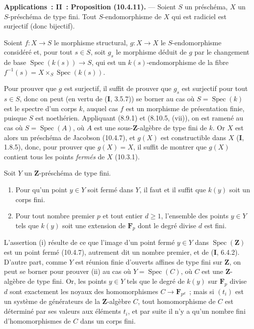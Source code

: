 \begin{env}[10.4.11]
\textbf{Applications~: II~: Proposition (10.4.11).} --- Soient $S$ un
préschéma, $X$ un $S$-préschéma de type fini. Tout $S$-endomorphisme de $X$
qui est radiciel est surjectif (donc bijectif).
\end{env}

Soient $f:X\to S$ le morphisme structural, $g:X\to X$ le $S$-endomorphisme
considéré et, pour tout $s\in S$, soit $g_s$ le morphisme déduit de $g$ par le
changement de base $\operatorname{Spec}(k(s))\to S$, qui est un
$k(s)$-endomorphisme de la fibre
$f^{-1}(s)=X\times_S\operatorname{Spec}(k(s))$.

Pour prouver que $g$ est surjectif, il suffit de prouver que $g_s$ est
surjectif pour tout $s\in S$, donc on peut (en vertu de (\textbf{I}, 3.5.7))
se borner au cas où $S=\operatorname{Spec}(k)$ est le spectre d'un corps $k$,
auquel cas $f$ est un morphisme de présentation finie, puisque $S$ est
noethérien. Appliquant (8.9.1) et (8.10.5, (vii)), on est ramené au cas où
$S=\operatorname{Spec}(A)$, où $A$ est une sous-$\mathbf Z$-algèbre de type
fini de $k$. Or $X$ est alors un préschéma de Jacobson (10.4.7), et $g(X)$ est
constructible dans $X$ (\textbf{I}, 1.8.5), donc, pour prouver que $g(X)=X$,
il suffit de montrer que $g(X)$ contient tous les points \emph{fermés} de $X$
(10.3.1).

\begin{lemma}[10.4.11.1]
\label{IV.10.4.11.1-fr}
Soit $Y$ un $\mathbf Z$-préschéma de type fini.
\begin{enumerate}[label=(\roman*)]
  \item Pour qu'un point $y\in Y$ soit fermé dans $Y$, il faut et il suffit
  que $k(y)$ soit un corps fini.
  \item Pour tout nombre premier $p$ et tout entier $d\geq1$, l'ensemble des
  points $y\in Y$ tels que $k(y)$ soit une extension de $\mathbf F_p$ dont le
  degré divise $d$ est fini.
\end{enumerate}
\end{lemma}

L'assertion (i) résulte de ce que l'image d'un point fermé $y\in Y$ dans
$\operatorname{Spec}(\mathbf Z)$ est un point fermé (10.4.7), autrement dit
un nombre premier, et de (\textbf{I}, 6.4.2). D'autre part, comme $Y$ est
réunion finie d'ouverts affines de type fini sur $\mathbf Z$, on peut se
borner pour prouver (ii) au cas où $Y=\operatorname{Spec}(C)$, où $C$ est une
$\mathbf Z$-algèbre de type fini. Or, les points $y\in Y$ tels que le degré de
$k(y)$ sur $\mathbf F_p$ divise $d$ sont exactement les noyaux des
homomorphismes $C\to\mathbf F_{p^d}$~; mais si $(t_i)$ est un système de
générateurs de la $\mathbf Z$-algèbre $C$, tout homomorphisme de $C$ est
déterminé par ses valeurs aux éléments $t_i$, et par suite il n'y a qu'un
nombre fini d'homomorphismes de $C$ dans un corps fini.

